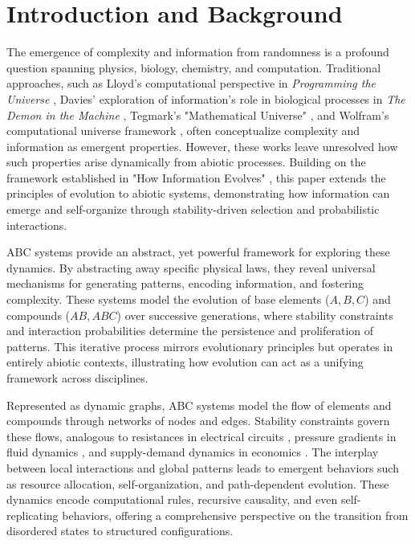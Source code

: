 \documentclass[%
 preprint, linenumbers,
 amsmath,amssymb,
 aps, physrev,
]{revtex4-2}
\begin{document}
\section{Introduction and Background}

The emergence of complexity and information from randomness is a profound question spanning physics, biology, chemistry, and computation. Traditional approaches, such as Lloyd's computational perspective in \textit{Programming the Universe} \cite{lloyd2006programming}, Davies' exploration of information's role in biological processes in \textit{The Demon in the Machine} \cite{davies2019demon}, Tegmark's "Mathematical Universe" \cite{tegmark2008mathematical}, and Wolfram's computational universe framework \cite{wolfram2020fundamental}, often conceptualize complexity and information as emergent properties. However, these works leave unresolved how such properties arise dynamically from abiotic processes. Building on the framework established in "How Information Evolves" \cite{adler2024howinfoevolves}, this paper extends the principles of evolution to abiotic systems, demonstrating how information can emerge and self-organize through stability-driven selection and probabilistic interactions.

ABC systems provide an abstract, yet powerful framework for exploring these dynamics. By abstracting away specific physical laws, they reveal universal mechanisms for generating patterns, encoding information, and fostering complexity. These systems model the evolution of base elements (\(A, B, C\)) and compounds (\(AB, ABC\)) over successive generations, where stability constraints and interaction probabilities determine the persistence and proliferation of patterns. This iterative process mirrors evolutionary principles but operates in entirely abiotic contexts, illustrating how evolution can act as a unifying framework across disciplines.

Represented as dynamic graphs, ABC systems model the flow of elements and compounds through networks of nodes and edges. Stability constraints govern these flows, analogous to resistances in electrical circuits \cite{nowak2006evolutionary}, pressure gradients in fluid dynamics \cite{landau1987fluid}, and supply-demand dynamics in economics \cite{mascolell1995microeconomic}. The interplay between local interactions and global patterns leads to emergent behaviors such as resource allocation, self-organization, and path-dependent evolution. These dynamics encode computational rules, recursive causality, and even self-replicating behaviors, offering a comprehensive perspective on the transition from disordered states to structured configurations.
\end{document}
